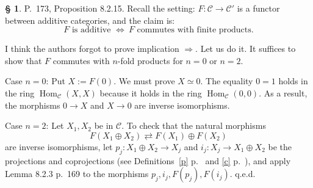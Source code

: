 \documentclass[12pt]{article}%
\theoremstyle{remark}
\theoremstyle{definition}
\newtheorem{s}[thm]{\S}%
\newcommand{\C}{\mathcal C}
\newcommand{\ssi}{\Leftrightarrow}%
\newcommand{\then}{\Rightarrow}
\DeclareMathOperator{\Hom}{Hom}%
\begin{document}
\begin{s} 
P.~173, Proposition 8.2.15. Recall the setting: $F:\C\to\C'$ is a functor between additive categories, and the claim is: 
$$
F\text{ is additive }\ssi\ F\text{ commutes with finite products}.
$$ 

I think the authors forgot to prove implication $\then$. Let us do it. It suffices to show that $F$ commutes with $n$-fold products for $n=0$ or $n=2$. 

Case $n=0$: Put $X:=F(0)$. We must prove $X\simeq 0$. The equality $0=1$ holds in the ring $\Hom_\C(X,X)$ because it holds in the ring $\Hom_\C(0,0)$. As a result, the morphisms $0\to X$ and $X\to 0$ are inverse isomorphisms. 

Case $n=2$: Let $X_1,X_2$ be in $\C$. To check that the natural morphisms 
%
\begin{equation}\label{173} 
F(X_1\oplus X_2)\rightleftarrows F(X_1)\oplus F(X_2)
\end{equation} 
%
are inverse isomorphisms, let $p_j:X_1\oplus X_2\to X_j$ and $i_j:X_j\to X_1\oplus X_2$ be the projections and coprojections (see Definitions~\ref{p} p.~\pageref{p} and \ref{c} p.~\pageref{c}), and apply Lemma 8.2.3 p.~169 to the morphisms $p_j,i_j,F(p_j),F(i_j)$. q.e.d.
\end{s}

%
\end{document}
